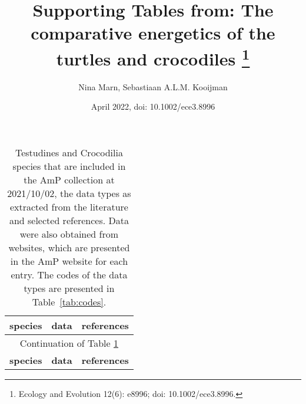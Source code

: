 \documentclass{article}
\begin{document}
\captionsetup{width=15cm}

\title{Supporting Tables from: The comparative energetics of the turtles and crocodiles
\footnote{Ecology and Evolution 12(6): e8996; doi: 10.1002/ece3.8996.}}

\author{
       Nina Marn,
       Sebastiaan A.L.M. Kooijman 
       }

\date{April 2022, doi: 10.1002/ece3.8996}

\maketitle

{\footnotesize\begin{longtable}[c]{p{3.5cm}p{5.5cm}p{5.5cm}} 
\caption{\label{tab:species}\protect\small
Testudines and Crocodilia species that are included in the AmP collection at 2021/10/02, the data types as extracted from the literature and selected references.
Data were also obtained from websites, which are presented in the AmP website for each entry. The codes of the data types are presented in Table~\ref{tab:codes}.} \\

\hline
\textbf{species} & \textbf{data} & \textbf{references} \\ \hline
\hline
\endfirsthead

\hline
\multicolumn{3}{|c|}{Continuation of Table \ref{tab:species}} \\ 
\hline
\textbf{species} & \textbf{data} & \textbf{references} \\ 
\hline
\endhead


\end{longtable}}
\end{document}
